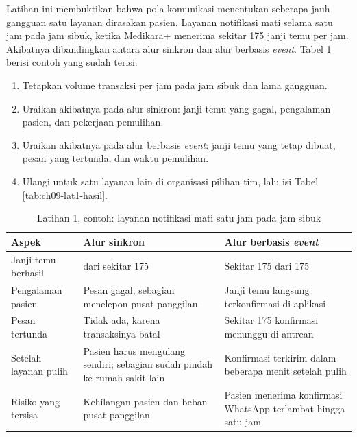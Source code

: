 Latihan ini membuktikan bahwa pola komunikasi menentukan seberapa jauh gangguan satu layanan
dirasakan pasien. Layanan notifikasi mati selama satu jam pada jam sibuk, ketika Medikara+ menerima
sekitar 175 janji temu per jam. Akibatnya dibandingkan antara alur sinkron dan alur berbasis
\textit{event}. Tabel \ref{tab:ch09-lat1-contoh} berisi contoh yang sudah terisi.

\begin{enumerate}
  \item Tetapkan volume transaksi per jam pada jam sibuk dan lama gangguan.
  \item Uraikan akibatnya pada alur sinkron: janji temu yang gagal, pengalaman pasien, dan pekerjaan
        pemulihan.
  \item Uraikan akibatnya pada alur berbasis \textit{event}: janji temu yang tetap dibuat, pesan
        yang tertunda, dan waktu pemulihan.
  \item Ulangi untuk satu layanan lain di organisasi pilihan tim, lalu isi Tabel
        \ref{tab:ch09-lat1-hasil}.
\end{enumerate}

\begin{table}[!htb]
  \centering
  \caption{Latihan 1, contoh: layanan notifikasi mati satu jam pada jam sibuk}
  \label{tab:ch09-lat1-contoh}
  \footnotesize
  \begin{tabularx}{\textwidth}{>{\raggedright\arraybackslash}p{2.6cm} >{\raggedright\arraybackslash}X >{\raggedright\arraybackslash}X}
    \hline
    \textbf{Aspek} & \textbf{Alur sinkron} & \textbf{Alur berbasis \textit{event}} \\ \hline
    Janji temu berhasil & 0 dari sekitar 175 & Sekitar 175 dari 175 \\ \hline
    Pengalaman pasien & Pesan gagal; sebagian menelepon pusat panggilan & Janji temu langsung
      terkonfirmasi di aplikasi \\ \hline
    Pesan tertunda & Tidak ada, karena transaksinya batal & Sekitar 175 konfirmasi menunggu di
      antrean \\ \hline
    Setelah layanan pulih & Pasien harus mengulang sendiri; sebagian sudah pindah ke rumah sakit
      lain & Konfirmasi terkirim dalam beberapa menit setelah pulih \\ \hline
    Risiko yang tersisa & Kehilangan pasien dan beban pusat panggilan & Pasien menerima konfirmasi
      WhatsApp terlambat hingga satu jam \\ \hline
  \end{tabularx}
\end{table}

